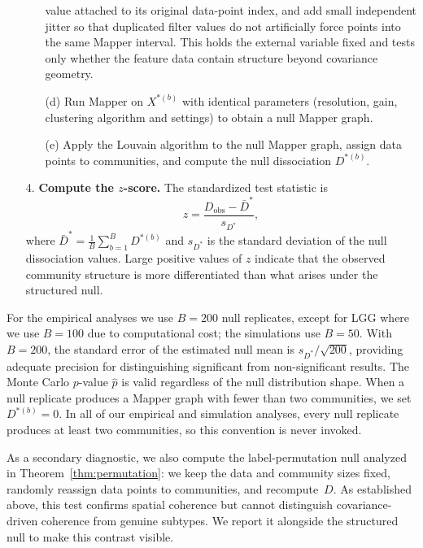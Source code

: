 \documentclass[hidelinks]{siamart251216}
\begin{document}
\begin{enumerate}
\begin{enumerate}
    value attached to its original data-point index, and add small
    independent jitter so that duplicated filter values do not
    artificially force points into the same Mapper interval.  This holds the external variable
    fixed and tests only whether the feature data contain structure
    beyond covariance geometry.
  \item[(d)] Run Mapper on $X^{*(b)}$ with identical parameters
    (resolution, gain, clustering algorithm and settings) to obtain a
    null Mapper graph.
  \item[(e)] Apply the Louvain algorithm to the null Mapper graph,
    assign data points to communities, and compute the null dissociation
    $D^{*(b)}$.
  \end{enumerate}
\item[4.] \textbf{Compute the $z$-score.} The standardized test
  statistic is
  \begin{equation}\label{eq:zscore}
    z = \frac{D_{\mathrm{obs}} - \bar{D}^*}{s_{D^*}},
  \end{equation}
  where $\bar{D}^* = \frac{1}{B} \sum_{b=1}^B D^{*(b)}$ and
  $s_{D^*}$ is the standard deviation of the null dissociation values.
  Large positive values of $z$ indicate that the observed community
  structure is more differentiated than what arises under the structured
  null.
\end{enumerate}

For the empirical analyses we use $B = 200$ null replicates, except
for LGG where we use $B = 100$ due to computational cost; the
simulations use $B = 50$.  With $B = 200$, the standard error of the
estimated null mean is $s_{D^*}/\sqrt{200}$, providing adequate
precision for distinguishing significant from non-significant results.  The Monte
Carlo $p$-value $\hat{p}$ is valid regardless of the null distribution
shape.  When a null replicate produces a Mapper graph with fewer than
two communities, we set $D^{*(b)} = 0$.  In all of our empirical
and simulation analyses, every null replicate produces at least two
communities, so this convention is never invoked.

As a secondary diagnostic, we also compute the label-permutation null
analyzed in Theorem~\ref{thm:permutation}: we keep the data and
community sizes fixed, randomly reassign data points to communities,
and recompute~$D$.  As established above, this test confirms spatial
coherence but cannot distinguish covariance-driven coherence from
genuine subtypes.  We report it alongside the structured null to make
this contrast visible.
\end{document}
